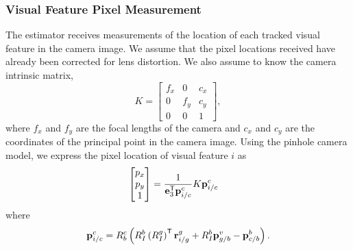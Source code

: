 \subsubsection{Visual Feature Pixel Measurement}
The estimator receives measurements of
the location of each tracked visual feature in the camera image. We assume that the
pixel locations received have already been corrected for lens distortion.
We also assume to know the camera intrinsic matrix,
\begin{equation}
  K =
  \begin{bmatrix}
    f_x & 0 & c_x \\
    0 & f_y & c_y \\
    0 & 0 & 1
  \end{bmatrix},
\end{equation}
where $f_x$ and $f_y$ are the focal lengths of the camera and $c_x$ and $c_y$
are the coordinates of the principal point in the camera image.
Using the pinhole camera model, we express the pixel location of
visual feature $i$ as
\begin{align}
  \begin{bmatrix}
    p_x \\ p_y \\ 1
  \end{bmatrix} &= \frac{1}{\e_3^\transpose \vect{p}_{i/c}^c} K
  \vect{p}_{i/c}^c
  \label{eq:pinhole_camera}
\end{align}
where
\begin{align}
  \vect{p}_{i/c}^c = R_b^c \left( R_I^b \left( R_I^g \right)^\transpose
  \vect{r}_{i/g}^g + R_I^b \vect{p}_{g/b}^v - \vect{p}_{c/b}^b \right).
  \label{eq:p_i_c_c}
\end{align}
